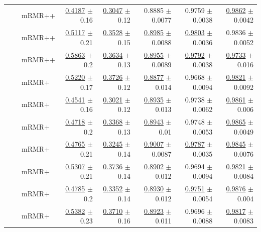 \begin{longtable}{llp{}rrrrr}
 &  & mRMR++ & \underline{0.4187} {\scriptsize $\pm$ 0.16} & \underline{0.3047} {\scriptsize $\pm$ 0.12} & 0.8885 {\scriptsize $\pm$ 0.0077} & 0.9759 {\scriptsize $\pm$ 0.0038} & \underline{0.9862} {\scriptsize $\pm$ 0.0042} \\
 &  & mRMR++ & \underline{0.5117} {\scriptsize $\pm$ 0.21} & \underline{0.3528} {\scriptsize $\pm$ 0.15} & \underline{0.8985} {\scriptsize $\pm$ 0.0088} & \underline{0.9803} {\scriptsize $\pm$ 0.0036} & 0.9836 {\scriptsize $\pm$ 0.0052} \\
 &  & mRMR++ & \underline{0.5863} {\scriptsize $\pm$ 0.2} & \underline{0.3634} {\scriptsize $\pm$ 0.13} & \underline{0.8955} {\scriptsize $\pm$ 0.0089} & \underline{0.9792} {\scriptsize $\pm$ 0.0038} & \underline{0.9733} {\scriptsize $\pm$ 0.016} \\
 &  & mRMR+ & \underline{0.5220} {\scriptsize $\pm$ 0.17} & \underline{0.3726} {\scriptsize $\pm$ 0.12} & \underline{0.8877} {\scriptsize $\pm$ 0.014} & 0.9668 {\scriptsize $\pm$ 0.0094} & \underline{0.9821} {\scriptsize $\pm$ 0.0092} \\
 &  & mRMR+ & \underline{0.4541} {\scriptsize $\pm$ 0.16} & \underline{0.3021} {\scriptsize $\pm$ 0.12} & \underline{0.8935} {\scriptsize $\pm$ 0.013} & 0.9738 {\scriptsize $\pm$ 0.0062} & \underline{0.9861} {\scriptsize $\pm$ 0.006} \\
 &  & mRMR+ & \underline{0.4718} {\scriptsize $\pm$ 0.2} & \underline{0.3368} {\scriptsize $\pm$ 0.13} & \underline{0.8943} {\scriptsize $\pm$ 0.01} & 0.9748 {\scriptsize $\pm$ 0.0053} & \underline{0.9865} {\scriptsize $\pm$ 0.0049} \\
 &  & mRMR+ & \underline{0.4765} {\scriptsize $\pm$ 0.21} & \underline{0.3245} {\scriptsize $\pm$ 0.14} & \underline{0.9007} {\scriptsize $\pm$ 0.0087} & \underline{0.9787} {\scriptsize $\pm$ 0.0035} & \underline{0.9845} {\scriptsize $\pm$ 0.0076} \\
 &  & mRMR+ & \underline{0.5307} {\scriptsize $\pm$ 0.21} & \underline{0.3736} {\scriptsize $\pm$ 0.14} & \underline{0.8902} {\scriptsize $\pm$ 0.012} & 0.9694 {\scriptsize $\pm$ 0.0094} & \underline{0.9821} {\scriptsize $\pm$ 0.0084} \\
 &  & mRMR+ & \underline{0.4785} {\scriptsize $\pm$ 0.2} & \underline{0.3352} {\scriptsize $\pm$ 0.14} & \underline{0.8930} {\scriptsize $\pm$ 0.012} & \underline{0.9751} {\scriptsize $\pm$ 0.0054} & \underline{0.9876} {\scriptsize $\pm$ 0.004} \\
 &  & mRMR+ & \underline{0.5382} {\scriptsize $\pm$ 0.23} & \underline{0.3710} {\scriptsize $\pm$ 0.16} & \underline{0.8923} {\scriptsize $\pm$ 0.011} & 0.9696 {\scriptsize $\pm$ 0.0088} & \underline{0.9817} {\scriptsize $\pm$ 0.0083} \\

\end{longtable}
